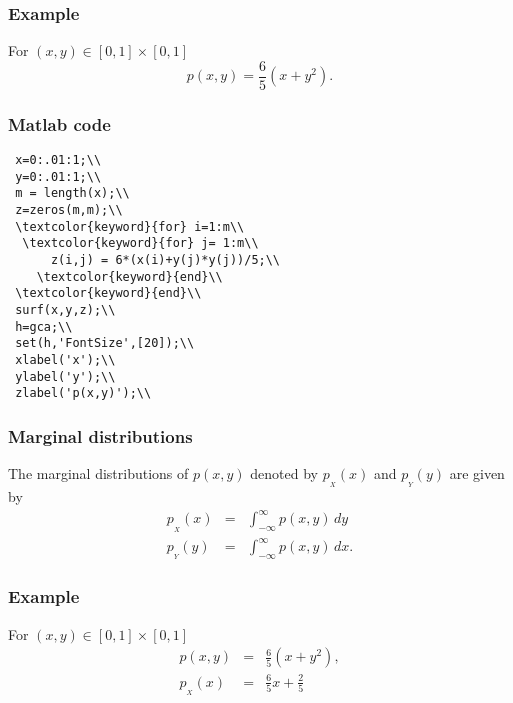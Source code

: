 \begin{frame}[fragile]\frametitle{Example}

For $(x,y) \in [0,1]\times[0,1]$
$$p(x,y) = \frac{6}{5}(x+y^2).$$ 

\center{\texttt{[image: jt1]} }

\end{frame}


\begin{frame}[fragile]\frametitle{Matlab code}

{\tiny

\begin{lstlisting}
 x=0:.01:1;\\
 y=0:.01:1;\\
 m = length(x);\\
 z=zeros(m,m);\\
 \textcolor{keyword}{for} i=1:m\\
  \textcolor{keyword}{for} j= 1:m\\
      z(i,j) = 6*(x(i)+y(j)*y(j))/5;\\
    \textcolor{keyword}{end}\\
 \textcolor{keyword}{end}\\
 surf(x,y,z);\\
 h=gca;\\
 set(h,'FontSize',[20]);\\
 xlabel('x');\\
 ylabel('y');\\
 zlabel('p(x,y)');\\
\end{lstlisting}
}
\end{frame}






\begin{frame}[fragile]\frametitle{Marginal distributions}

\begin{defn}
The marginal distributions of $p(x,y)$ denoted by
$p_{_X}(x)$ and $p_{_Y}(y)$ are given by
\begin{eqnarray*}
p_{_X}(x) & = & \int_{-\infty}^{\infty} p(x,y) \, dy\\
p_{_Y}(y) & = & \int_{-\infty}^{\infty} p(x,y) \, dx.
\end{eqnarray*}
\end{defn}

\end{frame}

\begin{frame}[fragile]\frametitle{Example}

For $(x,y) \in [0,1]\times[0,1]$
\begin{eqnarray*}
p(x,y) &= &\frac{6}{5}(x+y^2), \\ 
p_{_X}(x) & = & \frac{6}{5} x + \frac{2}{5}
\end{eqnarray*}


\end{frame}


